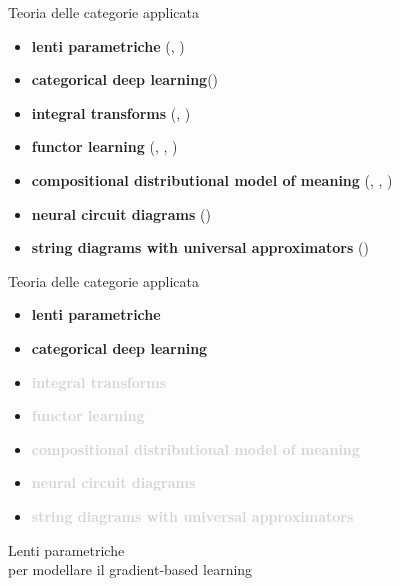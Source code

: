 \documentclass{beamer}
\begin{document}
\begin{frame}{Teoria delle categorie applicata}
    \begin{itemize}
        \item<1-> \textbf{lenti parametriche} {\footnotesize (\cite{gavranovic2024fundamental}, \cite{cruttwell2022categorical})}
        \item \textbf{categorical deep learning}{\footnotesize(\cite{gavranovicposition})}
        \item \textbf{integral transforms} {\footnotesize(\cite{dudzik2022graph}, \cite{dudzik2024asynchronous})}
        \item \textbf{functor learning} {\footnotesize(\cite{gavranovic2019compositional}, \cite{sheshmani2021categorical}, \cite{chytas2024poolingimagedatasetsmultiple})}
        \item \textbf{compositional distributional model of meaning} {\footnotesize(\cite{clark2007combining}, \cite{coecke2010mathematical}, \cite{lewis2019compositionality})}
        \item \textbf{neural circuit diagrams} {\footnotesize(\cite{abbott2023robust})}
        \item \textbf{string diagrams with universal approximators} {\footnotesize(\cite{khatri2024anatomy})}
    \end{itemize}
\end{frame}

\begin{frame}{Teoria delle categorie applicata}
    \begin{itemize}
        \item \textbf{lenti parametriche} 
        \item \textbf{categorical deep learning} 
        \item \textcolor{lightgray}{\textbf{integral transforms}}
        \item \textcolor{lightgray}{\textbf{functor learning}} 
        \item \textcolor{lightgray}{\textbf{compositional distributional model of meaning}}
        \item \textcolor{lightgray}{\textbf{neural circuit diagrams}}
        \item \textcolor{lightgray}{\textbf{string diagrams with universal approximators}}
    \end{itemize}
\end{frame}


\begin{frame}[standout]
    \huge Lenti parametriche \\\large per modellare il gradient-based learning
\end{frame}
\end{document}
